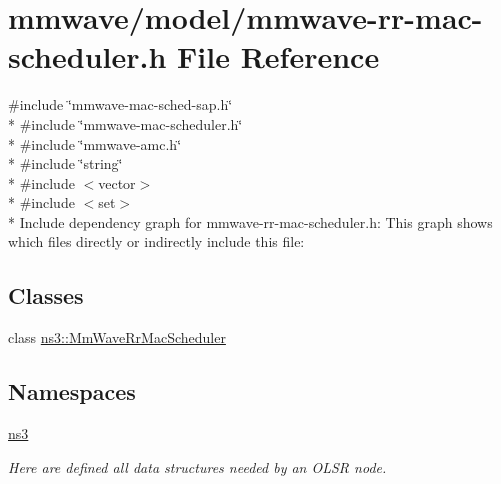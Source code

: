 \hypertarget{mmwave-rr-mac-scheduler_8h}{}\section{mmwave/model/mmwave-\/rr-\/mac-\/scheduler.h File Reference}
\label{mmwave-rr-mac-scheduler_8h}
{\ttfamily \#include \char`\"{}mmwave-\/mac-\/sched-\/sap.\+h\char`\"{}}\\*
{\ttfamily \#include \char`\"{}mmwave-\/mac-\/scheduler.\+h\char`\"{}}\\*
{\ttfamily \#include \char`\"{}mmwave-\/amc.\+h\char`\"{}}\\*
{\ttfamily \#include \char`\"{}string\char`\"{}}\\*
{\ttfamily \#include $<$vector$>$}\\*
{\ttfamily \#include $<$set$>$}\\*
Include dependency graph for mmwave-\/rr-\/mac-\/scheduler.h\+:
This graph shows which files directly or indirectly include this file\+:
\subsection*{Classes}
\begin{DoxyCompactItemize}
\item 
class \hyperlink{classns3_1_1MmWaveRrMacScheduler}{ns3\+::\+Mm\+Wave\+Rr\+Mac\+Scheduler}
\end{DoxyCompactItemize}
\subsection*{Namespaces}
\begin{DoxyCompactItemize}
\item 
 \hyperlink{namespacens3}{ns3}
\begin{DoxyCompactList}\small\item\em Here are defined all data structures needed by an O\+L\+SR node. \end{DoxyCompactList}\end{DoxyCompactItemize}
